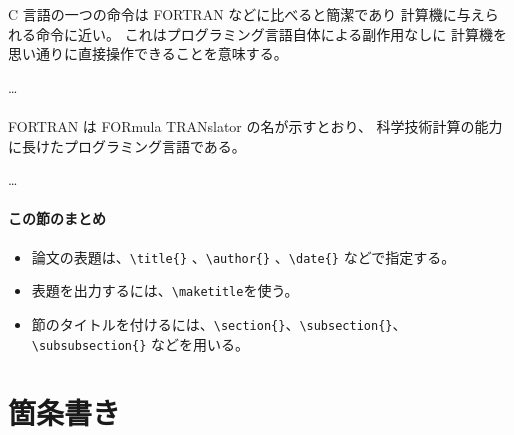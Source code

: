 \begin{kekka}
    C 言語の一つの命令は FORTRAN などに比べると簡潔であり
    計算機に与えられる命令に近い。
    これはプログラミング言語自体による副作用なしに
    計算機を思い通りに直接操作できることを意味する。

    \dots \\[.2em]

     \\[.2em]

    FORTRAN は FORmula TRANslator の名が示すとおり、
    科学技術計算の能力に長けたプログラミング言語である。

    \dots
\end{kekka}

\paragraph{この節のまとめ}

\begin{itemize}
    \item 論文の表題は、\verb|\title{}| 、\verb|\author{}| 、\verb|\date{}| などで指定する。
    \item 表題を出力するには、\verb|\maketitle|を使う。
    \item 節のタイトルを付けるには、\verb|\section{}|、\verb|\subsection{}|、\verb|\subsubsection{}| などを用いる。
\end{itemize}

\section{箇条書き}
\label{sec:latex:itemize}

